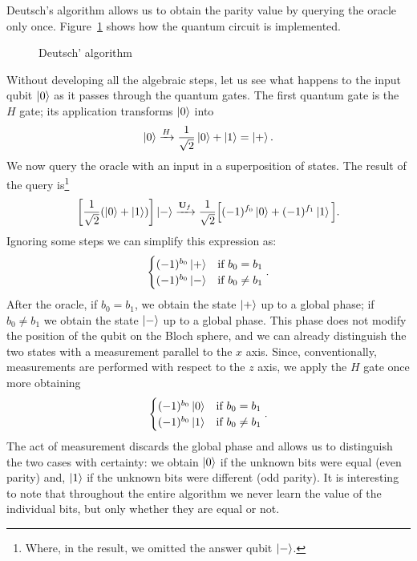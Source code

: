 Deutsch's algorithm allows us to obtain the parity value by querying the oracle only once. Figure~\ref{fig:deutsch} shows how the quantum circuit is implemented.
\begin{figure}[h]
	\centering
	\vspace{-.1cm}
	\caption{Deutsch' algorithm}
	\label{fig:deutsch}
\end{figure}

Without developing all the algebraic steps, let us see what happens to the input qubit $\Ket{0}$ as it passes through the quantum gates. The first quantum gate is the $H$ gate; its application transforms $\Ket{0}$ into
\[
\Ket{0} \xrightarrow{H} \frac{1}{\sqrt{2}}\Ket{0} + \Ket{1} = \Ket{+}.
\]
We now query the oracle with an input in a superposition of states. The result of the query is\footnote{Where, in the result, we omitted the answer qubit $\Ket{-}$.}
\[
\left[\frac{1}{\sqrt{2}}(\Ket{0} + \Ket{1})\right] \Ket{-} \xrightarrow{\mathbf{U}_f} \frac{1}{\sqrt{2}}\Big[(-1)^{f_0}\Ket{0} + (-1)^{f_1}\Ket{1}\Big].
\]
Ignoring some steps we can simplify this expression as:
\[
\begin{cases}
	(-1)^{b_0} \Ket{+} & \text{if } b_0=b_1\\
	(-1)^{b_0} \Ket{-} & \text{if } b_0\neq b_1
\end{cases}.
\]
After the oracle, if $ b_0=b_1$, we obtain the state $\Ket{+}$ up to a global phase; if $ b_0\neq b_1$ we obtain the state $\Ket{-}$ up to a global phase. This phase does not modify the position of the qubit on the Bloch sphere, and we can already distinguish the two states with a measurement parallel to the $x$ axis. Since, conventionally, measurements are performed with respect to the $z$ axis, we apply the $H$ gate once more obtaining
\[
\begin{cases}
	(-1)^{b_0} \Ket{0} & \text{if } b_0=b_1\\
	(-1)^{b_0} \Ket{1} & \text{if } b_0\neq b_1
\end{cases}.
\]
The act of measurement discards the global phase and allows us to distinguish the two cases with certainty: we obtain $\Ket{0}$ if the unknown bits were equal (even parity) and, $\Ket{1}$ if the unknown bits were different (odd parity). It is interesting to note that throughout the entire algorithm we never learn the value of the individual bits, but only whether they are equal or not.

